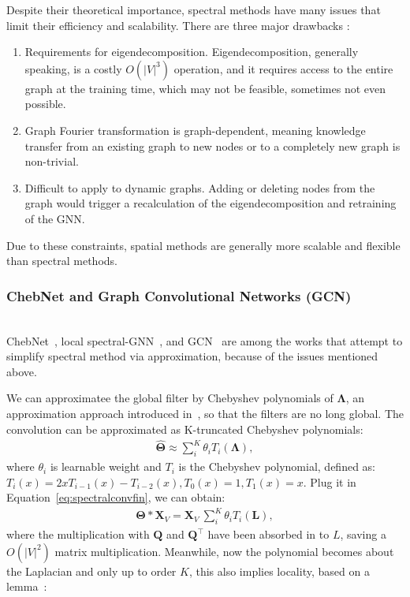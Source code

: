 Despite their theoretical importance, spectral methods have many issues that limit their efficiency and scalability. There are three major drawbacks :
\begin{enumerate}
\item Requirements for eigendecomposition. Eigendecomposition, generally speaking, is a costly $O(|V|^3)$ operation, and it requires access to the entire graph at the training time, which may not be feasible, sometimes not even possible.
\item Graph Fourier transformation is graph-dependent, meaning knowledge transfer from an existing graph to new nodes or to a completely new graph is non-trivial.
\item Difficult to apply to dynamic graphs. Adding or deleting nodes from the graph would trigger a recalculation of the eigendecomposition and retraining of the GNN.
\end{enumerate}

Due to these constraints, spatial methods are generally more scalable and flexible than spectral methods. 
\subsubsection{ChebNet and Graph Convolutional Networks (GCN)} \hfill \\
ChebNet~\cite{chebnet}, local spectral-GNN~\cite{hammond}, and GCN~\cite{gcn} are among the works that attempt to simplify spectral method via approximation, because of the issues mentioned above. 

We can approximatee the global filter by Chebyshev polynomials of $\mathbf{\Lambda}$, an approximation approach introduced in~\cite{hammond, chebnet}, so that the filters are no long global. The convolution can be approximated as K-truncated Chebyshev polynomials:
\begin{gather}
\hat {\mathbf{\Theta}} \approx \sum_i^K \theta_i T_i(\mathbf{\Lambda}),
\end{gather}
where $\theta_i$ is learnable weight and $T_i$ is the Chebyshev polynomial, defined as: $T_i(x) = 2xT_{i-1}(x) - T_{i-2}(x), T_0(x) = 1, T_1(x) = x$. Plug it in Equation~\ref{eq:spectralconvfin}, we can obtain:
\begin{gather}
\mathbf{\Theta} \ast \mathbf{X}_V = \mathbf{X}_V~\sum_i^K \theta_i T_i(\mathbf{L}),
\end{gather}
where the multiplication with $\mathbf{Q}$ and $\mathbf{Q}^\intercal$ have been absorbed in to $L$, saving a $O(|V|^2)$ matrix multiplication. Meanwhile, now the polynomial becomes about the Laplacian and only up to order $K$, this also implies locality, based on a lemma~\cite{hammond}:

